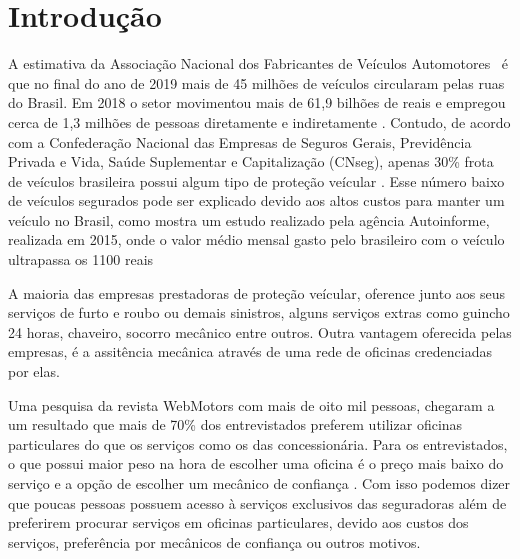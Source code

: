 \section{\esp Introdução}

A estimativa da Associação Nacional dos Fabricantes de Veículos Automotores~\cite{ANFAVEA2020} é que no final do ano de 2019 mais de 45 milhões de veículos circularam pelas ruas do Brasil. Em 2018 o setor movimentou mais de 61,9 bilhões de reais e empregou cerca de 1,3 milhões de pessoas diretamente e indiretamente \cite{ANFAVEA2020}. Contudo, de acordo com a Confederação Nacional das Empresas de Seguros Gerais, Previdência Privada e Vida, Saúde Suplementar e Capitalização (CNseg), apenas 30\% frota de veículos brasileira possui algum tipo de proteção veícular \cite{CNseg2019}. Esse número baixo de veículos segurados pode ser explicado devido aos altos custos para manter um veículo no Brasil, como mostra um estudo realizado pela agência Autoinforme, realizada em 2015, onde o valor médio mensal gasto pelo brasileiro com o veículo ultrapassa os 1100 reais \cite{Barros2015}

A maioria das empresas prestadoras de proteção veícular, oference junto aos seus serviços de furto e roubo ou demais sinistros, alguns serviços extras como guincho 24 horas, chaveiro, socorro mecânico entre outros. Outra vantagem oferecida pelas empresas, é a assitência mecânica através de uma rede de oficinas credenciadas por elas. 

Uma pesquisa da revista WebMotors com mais de oito mil pessoas, chegaram a um resultado que mais de 70\% dos entrevistados preferem utilizar oficinas particulares do que os serviços como os das concessionária. Para os entrevistados, o que possui maior peso na hora de escolher uma oficina é o preço mais baixo do serviço e a opção de escolher um mecânico de confiança \cite{Bandeira2019}. Com isso podemos dizer que poucas pessoas possuem acesso à serviços exclusivos das seguradoras além de preferirem procurar serviços em oficinas particulares, devido aos custos dos serviços, preferência por mecânicos de confiança ou outros motivos.

